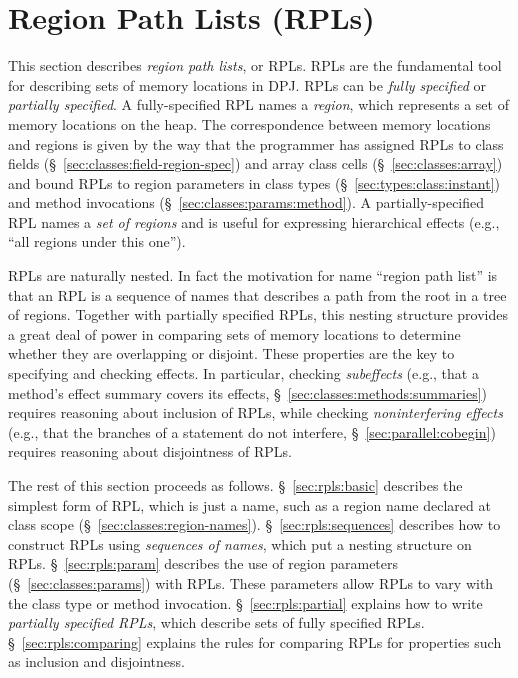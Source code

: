 \section{Region Path Lists (RPLs)%
\label{sec:rpls}}

This section describes \emph{region path lists}, or RPLs.  RPLs are
the fundamental tool for describing sets of memory locations in DPJ.
RPLs can be \emph{fully specified} or \emph{partially specified}.  A
fully-specified RPL names a \emph{region}, which represents a set of
memory locations on the heap. The correspondence between memory
locations and regions is given by the way that the programmer has
assigned RPLs to class fields (\S~\ref{sec:classes:field-region-spec})
and array class cells (\S~\ref{sec:classes:array}) and bound RPLs to
region parameters in class types (\S~\ref{sec:types:class:instant})
and method invocations (\S~\ref{sec:classes:params:method}). A
partially-specified RPL names a \emph{set of regions} and is useful
for expressing hierarchical effects (e.g., ``all regions under this
one'').

RPLs are naturally nested.  In fact the motivation for name ``region
path list'' is that an RPL is a sequence of names that describes a
path from the root in a tree of regions.  Together with partially
specified RPLs, this nesting structure provides a great deal of power
in comparing sets of memory locations to determine whether they are
overlapping or disjoint.  These properties are the key to specifying
and checking effects.  In particular, checking \emph{subeffects}
(e.g., that a method's effect summary covers its effects,
\S~\ref{sec:classes:methods:summaries}) requires reasoning about
inclusion of RPLs, while checking \emph{noninterfering effects} (e.g.,
that the branches of a  statement do not interfere,
\S~\ref{sec:parallel:cobegin}) requires reasoning about disjointness
of RPLs.

The rest of this section proceeds as follows.  \S~\ref{sec:rpls:basic}
describes the simplest form of RPL, which is just a name, such as a
region name declared at class scope
(\S~\ref{sec:classes:region-names}).  \S~\ref{sec:rpls:sequences}
describes how to construct RPLs using \emph{sequences of names}, which
put a nesting structure on RPLs.  \S~\ref{sec:rpls:param} describes
the use of region parameters (\S~\ref{sec:classes:params}) with RPLs.
These parameters allow RPLs to vary with the class type or method
invocation.  \S~\ref{sec:rpls:partial} explains how to write
\emph{partially specified RPLs}, which describe sets of fully
specified RPLs.  \S~\ref{sec:rpls:comparing} explains the rules for
comparing RPLs for properties such as inclusion and disjointness.

